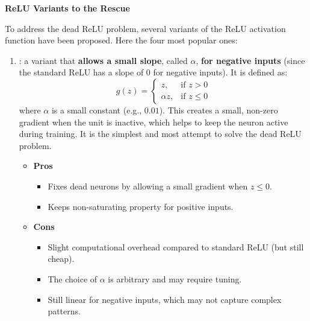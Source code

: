 \highspace
\begin{flushleft}
    \textcolor{Green3}{ \textbf{ReLU Variants to the Rescue}}
\end{flushleft}
To address the dead ReLU problem, several variants of the ReLU activation function have been proposed. Here the four most popular ones:
\begin{enumerate}
    \item {}: a variant that \textbf{allows a small slope}, called $\alpha$, \textbf{for negative inputs} (since the standard ReLU has a slope of 0 for negative inputs). It is defined as:
    \begin{equation}
        g\left(z\right) = \begin{cases}
            z, & \text{if } z > 0 \\
            \alpha z, & \text{if } z \leq 0
        \end{cases}
    \end{equation}
    where $\alpha$ is a small constant (e.g., $0.01$). This creates a small, non-zero gradient when the unit is inactive, which helps to keep the neuron active during training. It is the simplest and most \naive attempt to solve the dead ReLU problem.
    \begin{itemize}
        \item[\textcolor{Green3}{\faIcon{check-circle}}] \textcolor{Green3}{\textbf{Pros}}
        \begin{itemize}
            \item[\textcolor{Green3}{\faIcon{check}}] Fixes dead neurons by allowing a small gradient when $z \leq 0$.
            \item[\textcolor{Green3}{\faIcon{check}}] Keeps non-saturating property for positive inputs.
        \end{itemize}
        \item[\textcolor{Red2}{\faIcon{times-circle}}] \textcolor{Red2}{\textbf{Cons}}
        \begin{itemize}
            \item[\textcolor{Red2}{\faIcon{times}}] Slight computational overhead compared to standard ReLU (but still cheap).
            \item[\textcolor{Red2}{\faIcon{times}}] The choice of $\alpha$ is arbitrary and may require tuning.
            \item[\textcolor{Red2}{\faIcon{times}}] Still linear for negative inputs, which may not capture complex patterns.
        \end{itemize}
    \end{itemize}
    


\end{enumerate}
